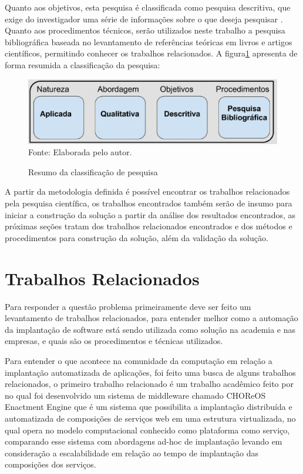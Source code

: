 Quanto aos objetivos, esta pesquisa é classificada como pesquisa descritiva, que
exige do investigador uma série de informações sobre o que deseja pesquisar
\cite{trivinos1987introduccao}. Quanto aos procedimentos técnicos, serão utilizados
neste trabalho a pesquisa bibliográfica baseada no levantamento de referências
teóricas em livros e artigos científicos, permitindo conhecer os trabalhos
relacionados. A figura\ref{fig:metodologia1} apresenta de forma resumida a
classificação da pesquisa:

\begin{figure}[h]
  \centering
  \caption{Resumo da classificação de pesquisa}
  \includegraphics[width=1.0\textwidth]
      {figuras/met1.eps}
      Fonte: Elaborada pelo autor.
\label{fig:metodologia1}
\end{figure}

A partir da metodologia definida é possível encontrar os trabalhos relacionados
pela pesquisa científica, os trabalhos encontrados também serão de insumo para iniciar
a construção da solução a partir da análise dos resultados encontrados,
as próximas seções tratam dos trabalhos relacionados encontrados e dos métodos e
procedimentos para construção da solução, além da validação da solução.

\section{Trabalhos Relacionados}
\label{section:trabalhos_relacionados}
Para responder a questão problema primeiramente deve ser feito um levantamento
de trabalhos relacionados, para entender melhor como a automação da implantação
de software está sendo utilizada como solução na academia e nas empresas, e
quais são os procedimentos e técnicas utilizados.

Para entender o que acontece na comunidade da computação em relação a implantação
automatizada de aplicações, foi feito uma busca de alguns trabalhos relacionados, o primeiro
trabalho relacionado é um trabalho acadêmico feito por \cite{leo2014} no qual foi
desenvolvido um sistema de middleware chamado CHOReOS Enactment Engine que é um
sistema que possibilita a implantação distribuída e automatizada de composições
de serviços web em uma estrutura virtualizada, no qual opera no modelo
computacional conhecido como plataforma como serviço, comparando esse sistema
com abordagens ad-hoc de implantação levando em consideração a escalabilidade
em relação ao tempo de implantação das composições dos serviços.

